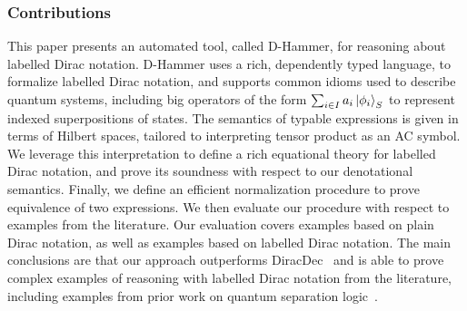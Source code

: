 \subsubsection*{Contributions}
This paper presents an automated tool, called D-Hammer, for reasoning
about labelled Dirac notation. D-Hammer uses a rich, dependently typed
language, to formalize labelled Dirac notation, and supports common
idioms used to describe quantum systems, including big operators of
the form $\sum_{i\in I} a_i \ket{\phi_i}_S$ to represent indexed
superpositions of states. The semantics of typable expressions is
given in terms of Hilbert spaces, tailored to interpreting tensor
product as an AC symbol. We leverage this interpretation to define a
rich equational theory for labelled Dirac notation, and prove its
soundness with respect to our denotational semantics. Finally, we
define an efficient normalization procedure to prove equivalence of
two expressions. We then evaluate our procedure with respect to
examples from the literature. Our evaluation covers examples based on
plain Dirac notation, as well as examples based on
labelled Dirac notation. The main conclusions are that our approach
outperforms DiracDec~\cite{diracdec} and is able to prove complex
examples of reasoning with labelled Dirac notation from the
literature, including examples from prior work on quantum separation
logic~\cite{DBLP:conf/lics/ZhouBHYY21}.





